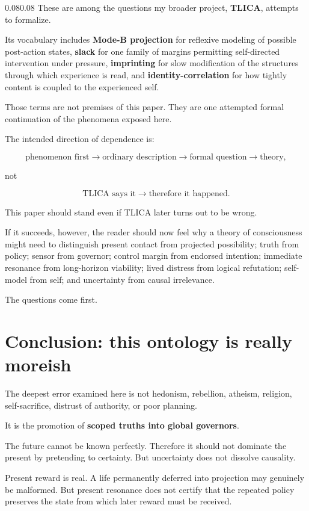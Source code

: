 \documentclass[10pt,letterpaper]{article}
\newenvironment{paperbody}
  {\begin{adjustwidth}{0.08\textwidth}{0.08\textwidth}\justifying}
  {\par\end{adjustwidth}}
\let\oldsection\section
\renewcommand{\section}{\Needspace{6\baselineskip}\oldsection}
\begin{document}
\begin{paperbody}
These are among the questions my broader project, \textbf{TLICA},
attempts to formalize.

Its vocabulary includes \textbf{Mode-B projection} for reflexive
modeling of possible post-action states, \textbf{slack} for one family
of margins permitting self-directed intervention under pressure,
\textbf{imprinting} for slow modification of the structures through
which experience is read, and \textbf{identity-correlation} for how
tightly content is coupled to the experienced self.

Those terms are not premises of this paper. They are one attempted
formal continuation of the phenomena exposed here.

The intended direction of dependence is:

\[
\text{phenomenon first}
\to
\text{ordinary description}
\to
\text{formal question}
\to
\text{theory},
\]

not

\[
\text{TLICA says it}
\to
\text{therefore it happened}.
\]

This paper should stand even if TLICA later turns out to be wrong.

If it succeeds, however, the reader should now feel why a theory of
consciousness might need to distinguish present contact from projected
possibility; truth from policy; sensor from governor; control margin
from endorsed intention; immediate resonance from long-horizon
viability; lived distress from logical refutation; self-model from self;
and uncertainty from causal irrelevance.

The questions come first.

\section{Conclusion: this ontology is really
moreish}\label{conclusion-this-ontology-is-really-moreish}

The deepest error examined here is not hedonism, rebellion, atheism,
religion, self-sacrifice, distrust of authority, or poor planning.

It is the promotion of \textbf{scoped truths into global governors}.

The future cannot be known perfectly. Therefore it should not dominate
the present by pretending to certainty. But uncertainty does not
dissolve causality.

Present reward is real. A life permanently deferred into projection may
genuinely be malformed. But present resonance does not certify that the
repeated policy preserves the state from which later reward must be
received.


\end{paperbody}
\end{document}
